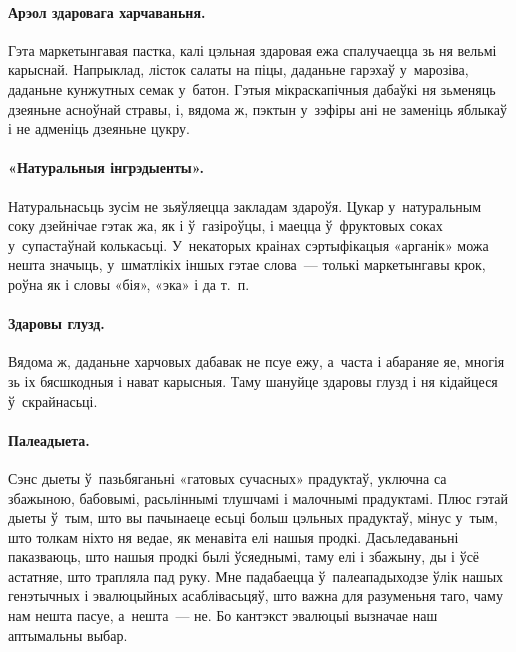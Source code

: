 \paragraph{Арэол здаровага харчаваньня.}
Гэта маркетынгавая пастка, калі цэльная здаровая ежа спалучаецца зь ня вельмі карыснай. Напрыклад, лісток салаты на піцы, даданьне гарэхаў у~марозіва, даданьне кунжутных семак у~батон. Гэтыя мікраскапічныя дабаўкі ня зьменяць дзеяньне асноўнай стравы, і, вядома ж, пэктын у~зэфіры ані не заменіць яблыкаў і не адменіць дзеяньне цукру.

\paragraph{«Натуральныя інгрэдыенты».}
Натуральнасьць зусім не зьяўляецца закладам здароўя. Цукар у~натуральным соку дзейнічае гэтак жа, як і ў~газіроўцы, і маецца ў~фруктовых соках у~супастаўнай колькасьці. У~некаторых краінах сэртыфікацыя «арганік» можа нешта значыць, у~шматлікіх іншых гэтае слова~--- толькі маркетынгавы крок, роўна як і словы «бія», «эка» і да т.~п.


\paragraph{Здаровы глузд.}
Вядома ж, даданьне харчовых дабавак не псуе ежу, а~часта і абараняе яе, многія зь іх бясшкодныя і нават карысныя. Таму шануйце здаровы глузд і ня кідайцеся ў~скрайнасьці.

\paragraph{Палеадыета.}
Сэнс дыеты ў~пазьбяганьні «гатовых сучасных» прадуктаў, уключна са збажыною, бабовымі, расьліннымі тлушчамі і малочнымі прадуктамі. Плюс гэтай дыеты ў~тым, што вы пачынаеце есьці больш цэльных прадуктаў, мінус у~тым, што толкам ніхто ня ведае, як менавіта елі нашыя продкі. Дасьледаваньні паказваюць, што нашыя продкі былі ўсяеднымі, таму елі і збажыну, ды і ўсё астатняе, што трапляла пад руку. Мне падабаецца ў~палеападыходзе ўлік нашых генэтычных і эвалюцыйных асаблівасьцяў, што важна для разуменьня таго, чаму нам нешта пасуе, а~нешта~--- не. Бо кантэкст эвалюцыі вызначае наш аптымальны выбар.

